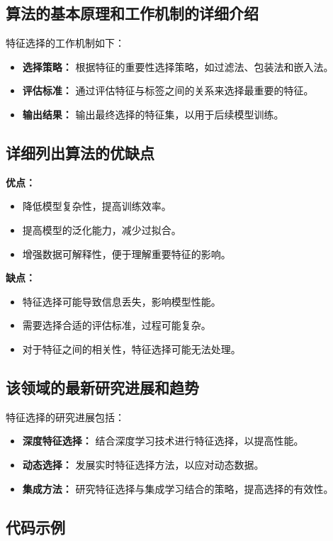 \subsection*{算法的基本原理和工作机制的详细介绍}
特征选择的工作机制如下：
\begin{itemize}
    \item \textbf{选择策略：} 根据特征的重要性选择策略，如过滤法、包装法和嵌入法。
    \item \textbf{评估标准：} 通过评估特征与标签之间的关系来选择最重要的特征。
    \item \textbf{输出结果：} 输出最终选择的特征集，以用于后续模型训练。
\end{itemize}

\subsection*{详细列出算法的优缺点}
\textbf{优点：}
\begin{itemize}
    \item 降低模型复杂性，提高训练效率。
    \item 提高模型的泛化能力，减少过拟合。
    \item 增强数据可解释性，便于理解重要特征的影响。
\end{itemize}

\textbf{缺点：}
\begin{itemize}
    \item 特征选择可能导致信息丢失，影响模型性能。
    \item 需要选择合适的评估标准，过程可能复杂。
    \item 对于特征之间的相关性，特征选择可能无法处理。
\end{itemize}

\subsection*{该领域的最新研究进展和趋势}
特征选择的研究进展包括：
\begin{itemize}
    \item \textbf{深度特征选择：} 结合深度学习技术进行特征选择，以提高性能。
    \item \textbf{动态选择：} 发展实时特征选择方法，以应对动态数据。
    \item \textbf{集成方法：} 研究特征选择与集成学习结合的策略，提高选择的有效性。
\end{itemize}
\subsection*{代码示例}
\begin{lstlisting}

\end{lstlisting}


